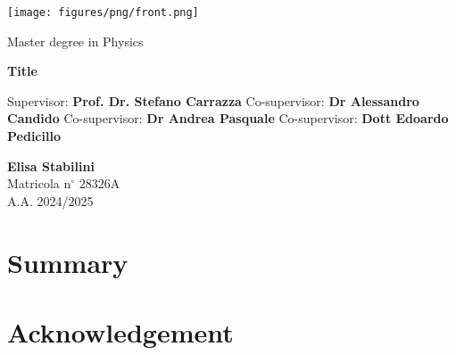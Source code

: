 \documentclass{book}
\theoremstyle{definition}
\begin{document}
\frontmatter
{
\thispagestyle{empty}

\centerline{
\texttt{[image: figures/png/front.png]}
}



\begin{center}
{\Large  Master degree in Physics }
\end{center}


\vskip1.5cm
\begin{center}
{\fontsize{15}{20}\selectfont \textbf{Title\\}}
\end{center}


{\large
\vskip 20mm Supervisor:
\vskip 0.2mm \large  \textbf{Prof. Dr. Stefano Carrazza}
\vskip 5mm
\large Co-supervisor:
\vskip 0.2mm
\large \textbf{Dr Alessandro Candido}
\vskip 5mm
\large Co-supervisor:
\vskip 0.2mm
\large \textbf{Dr Andrea Pasquale}
\vskip 5mm
\large Co-supervisor:
\vskip 0.2mm
\large \textbf{Dott Edoardo Pedicillo}
}
}

\vskip 2cm
\noindent
\hfill
\parbox[t]{7cm}{
    \large
    \raggedright
    \textbf{Elisa Stabilini} \\
    Matricola n$^\circ$ $28326\mathrm{A}$ \\
    A.A. 2024/2025
}  
\clearpage


\clearpage
\tableofcontents
\clearpage

\chapter*{Summary}
%


\chapter*{Acknowledgement}
\end{document}
